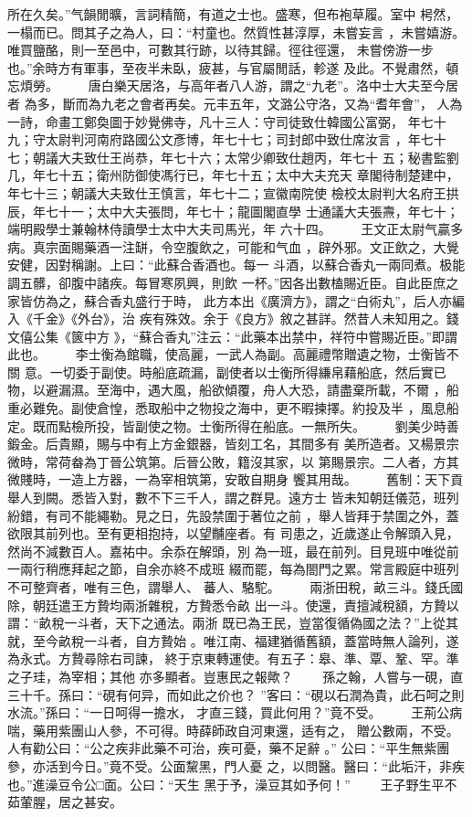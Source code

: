 \documentclass{ctexart}
\begin{document}
所在久矣。''气韻閒曠，言詞精簡，有道之士也。盛寒，但布袍草履。室中 枵然，一榻而已。問其子之為人，曰：``村童也。然質性甚淳厚，未嘗妄言 ，未嘗嬉游。唯買鹽酪，則一至邑中，可數其行跡，以待其歸。徑往徑還， 未嘗傍游一步也。''余時方有軍事，至夜半未臥，疲甚，与官屬閒話，軫遂 及此。不覺肅然，頓忘煩勞。 　　唐白樂天居洛，与高年者八人游，謂之``九老''。洛中士大夫至今居者 為多，斷而為九老之會者再矣。元丰五年，文潞公守洛，又為``耆年會''， 人為一詩，命畫工鄭奐圖于妙覺佛寺，凡十三人：守司徒致仕韓國公富弼， 年七十九；守太尉判河南府路國公文彥博，年七十七；司封郎中致仕席汝言 ，年七十七；朝議大夫致仕王尚恭，年七十六；太常少卿致仕趙丙，年七十 五；秘書監劉几，年七十五；衛州防御使馮行已，年七十五；太中大夫充天 章閣待制楚建中，年七十三；朝議大夫致仕王慎言，年七十二；宣徽南院使 檢校太尉判大名府王拱辰，年七十一；太中大夫張問，年七十；龍圖閣直學 士通議大夫張燾，年七十；端明殿學士兼翰林侍讀學士太中大夫司馬光，年 六十四。 　　王文正太尉气贏多病。真宗面賜藥酒一注缾，令空腹飲之，可能和气血 ，辟外邪。文正飲之，大覺安健，因對稱謝。上曰：``此蘇合香酒也。每一 斗酒，以蘇合香丸一兩同煮。极能調五髒，卻腹中諸疾。每冒寒夙興，則飲 一杯。''因各出數榼賜近臣。自此臣庶之家皆仿為之，蘇合香丸盛行于時， 此方本出《廣濟方》，謂之``白術丸''，后人亦編入《千金》《外台》，治 疾有殊效。余于《良方》敘之甚詳。然昔人未知用之。錢文僖公集《篋中方 》，``蘇合香丸''注云：``此藥本出禁中，祥符中嘗賜近臣。''即謂此也。 　　李士衡為館職，使高麗，一武人為副。高麗禮幣贈遺之物，士衡皆不關 意。一切委于副使。時船底疏漏，副使者以士衡所得縑帛藉船底，然后實已 物，以避漏濕。至海中，遇大風，船欲傾覆，舟人大恐，請盡棄所載，不爾 ，船重必難免。副使倉惶，悉取船中之物投之海中，更不暇揀擇。約投及半 ，風息船定。既而點檢所投，皆副使之物。士衡所得在船底。一無所失。 　　劉美少時善鍛金。后貴顯，賜与中有上方金銀器，皆刻工名，其間多有 美所造者。又楊景宗微時，常荷畚為丁晉公筑第。后晉公敗，籍沒其家，以 第賜景宗。二人者，方其微賤時，一造上方器，一為宰相筑第，安敢自期身 饗其用哉。 　　舊制：天下貢舉人到闕。悉皆入對，數不下三千人，謂之群見。遠方士 皆未知朝廷儀范，班列紛錯，有司不能繩勒。見之日，先設禁圍于著位之前 ，舉人皆拜于禁圍之外，蓋欲限其前列也。至有更相抱持，以望黼座者。有 司患之，近歲遂止令解頭入見，然尚不減數百人。嘉祐中。余忝在解頭，別 為一班，最在前列。目見班中唯從前一兩行稍應拜起之節，自余亦終不成班 綴而罷，每為閤門之累。常言殿庭中班列不可整齊者，唯有三色，謂舉人、 蕃人、駱駝。 　　兩浙田稅，畝三斗。錢氏國除，朝廷遣王方贄均兩浙雜稅，方贄悉令畝 出一斗。使還，責擅減稅額，方贄以謂：``畝稅一斗者，天下之通法。兩浙 既已為王民，豈當復循偽國之法？''上從其就，至今畝稅一斗者，自方贄始 。唯江南、福建猶循舊額，蓋當時無人論列，遂為永式。方贄尋除右司諫， 終于京東轉運使。有五子：皋、準、覃、鞏、罕。準之子珪，為宰相；其他 亦多顯者。豈惠民之報歟？ 　　孫之翰，人嘗与一硯，直三十千。孫曰：``硯有何异，而如此之价也？ ''客曰：``硯以石潤為貴，此石呵之則水流。''孫曰：``一日呵得一擔水， 才直三錢，買此何用？''竟不受。 　　王荊公病喘，藥用紫團山人參，不可得。時薛師政自河東還，适有之， 贈公數兩，不受。人有勸公曰：``公之疾非此藥不可治，疾可憂，藥不足辭 。'' 公曰：``平生無紫團參，亦活到今日。''竟不受。公面黧黑，門人憂 之，以問醫。醫曰：``此垢汗，非疾也。''進澡豆令公□面。公曰：``天生 黑于予，澡豆其如予何！'' 　　王子野生平不茹葷腥，居之甚安。 
\end{document}

